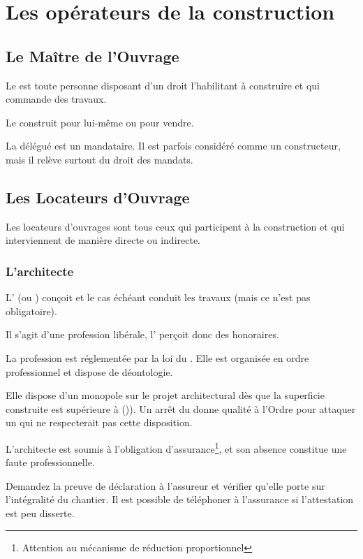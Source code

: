 \chapter{Les opérateurs de la construction}
	
	\section{Le Maître de l'Ouvrage}
	
		Le \Mo{} est toute personne disposant d'un droit l'habilitant à construire et qui commande des travaux.
		
		Le \Mo{} construit pour lui-même ou pour vendre.
		
		La \Mo{} délégué est un mandataire. Il est parfois considéré comme un constructeur, mais il relève surtout du droit des mandats.
	
	\section{Les Locateurs d'Ouvrage}
	
		Les locateurs d'ouvrages sont tous ceux qui participent à la construction et qui interviennent de manière directe ou indirecte.
		
		\subsection{L'architecte}
		
			L'\archi{} (ou \Moe) conçoit et le cas échéant conduit les travaux (mais ce n'est pas obligatoire). 
			
			Il s'agit d'une profession libérale, l'\archi{} perçoit donc des honoraires.
			
			La profession est réglementée par la loi du . Elle est organisée en ordre professionnel et dispose de déontologie.
			
			Elle dispose d'un monopole sur le projet architectural dès que la superficie construite est supérieure à   ()). Un arrêt du \CE{} donne qualité à l'Ordre pour attaquer un \PC{} qui ne respecterait pas cette disposition.
			
			L'architecte est soumis à l'obligation d'assurance\footnote{Attention au mécanisme de réduction proportionnel}, et son absence constitue une faute professionnelle.
			
			\begin{conseil}
				Demandez la preuve de déclaration à l'assureur et vérifier qu'elle porte sur l'intégralité du chantier. Il est possible de téléphoner à l'assurance si l'attestation est peu disserte.
			\end{conseil}

